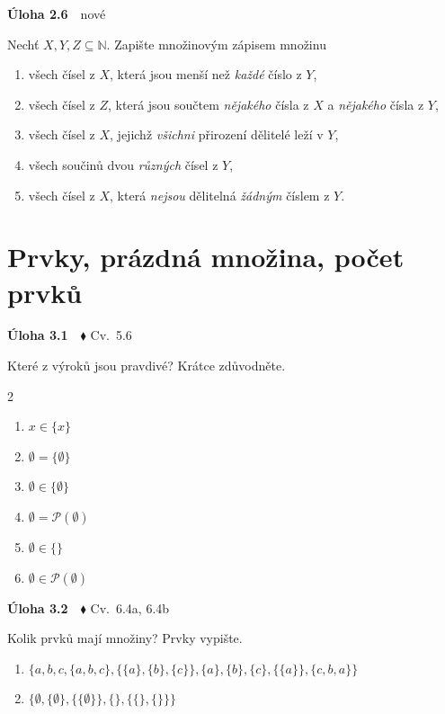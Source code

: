 \documentclass[11pt,a4paper]{article}
\newcommand{\N}{\mathbb N}\newcommand{\Z}{\mathbb Z}\newcommand{\Pot}{\mathcal P}
\newenvironment{pol}{\begin{enumerate}[label=(\alph*),leftmargin=2em,itemsep=3pt]}{\end{enumerate}}
\newenvironment{dvasl}{\begin{multicols}{2}\begin{enumerate}[label=(\alph*),leftmargin=2em,itemsep=3pt]}{\end{enumerate}\end{multicols}}
\newenvironment{uloha}[2]{\Needspace{6\baselineskip}\par\vspace{6pt}\noindent\textbf{Úloha #1}\ \ {\footnotesize\color{gray}#2}\par\vspace{2pt}}{\par\vspace{4pt}}
\begin{document}
\begin{uloha}{2.6}{nové}
Nechť $X,Y,Z\subseteq\N$. Zapište množinovým zápisem množinu
\begin{pol}
  \item všech čísel z $X$, která jsou menší než \emph{každé} číslo z $Y$,
  \item všech čísel z $Z$, která jsou součtem \emph{nějakého} čísla z $X$ a \emph{nějakého} čísla z $Y$,
  \item všech čísel z $X$, jejichž \emph{všichni} přirození dělitelé leží v $Y$,
  \item všech součinů dvou \emph{různých} čísel z $Y$,
  \item všech čísel z $X$, která \emph{nejsou} dělitelná \emph{žádným} číslem z $Y$.
\end{pol}

\end{uloha}

\section{Prvky, prázdná množina, počet prvků}

\begin{uloha}{3.1}{$\blacklozenge$ Cv.~5.6}
Které z výroků jsou pravdivé? Krátce zdůvodněte.
\begin{dvasl}
  \item $x\in\{x\}$
  \item $\emptyset=\{\emptyset\}$
  \item $\emptyset\in\{\emptyset\}$
  \item $\emptyset=\mathcal P(\emptyset)$
  \item $\emptyset\in\{\}$
  \item $\emptyset\in\mathcal P(\emptyset)$
\end{dvasl}

\end{uloha}

\begin{uloha}{3.2}{$\blacklozenge$ Cv.~6.4a, 6.4b}
Kolik prvků mají množiny? Prvky vypište.
\begin{pol}
  \item $\{a,b,c,\{a,b,c\},\{\{a\},\{b\},\{c\}\},\{a\},\{b\},\{c\},\{\{a\}\},\{c,b,a\}\}$
  \item $\{\emptyset,\{\emptyset\},\{\{\emptyset\}\},\{\},\{\{\},\{\}\}\}$
\end{pol}

\end{uloha}
\end{document}
